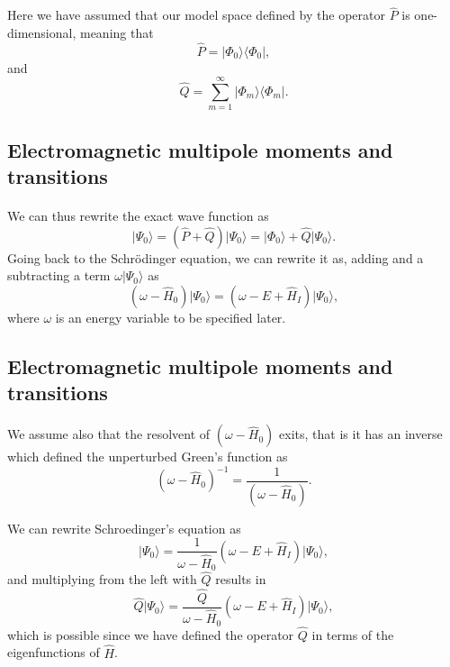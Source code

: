 \documentclass[%
oneside,                 %
final,                   %
10pt]{article}
\begin{document}
Here we have assumed that our model space defined by the operator $\hat{P}$ is one-dimensional, meaning that
\[
\hat{P}= \vert \Phi_0\rangle \langle \Phi_0\vert ,
\]
and
\[
\hat{Q}=\sum_{m=1}^{\infty}\vert \Phi_m\rangle \langle \Phi_m\vert .
\]



\subsection{Electromagnetic multipole moments and transitions}

\paragraph{}
We can thus rewrite the exact wave function as
\[
\vert \Psi_0\rangle= (\hat{P}+\hat{Q})\vert \Psi_0\rangle=\vert \Phi_0\rangle+\hat{Q}\vert \Psi_0\rangle.
\]
Going back to the Schr\"odinger equation, we can rewrite it as, adding and a subtracting a term $\omega \vert \Psi_0\rangle$ as
\[
\left(\omega-\hat{H}_0\right)\vert \Psi_0\rangle=\left(\omega-E+\hat{H}_I\right)\vert \Psi_0\rangle,
\]
where $\omega$ is an energy variable to be specified later.



\subsection{Electromagnetic multipole moments and transitions}

\paragraph{}
We assume also that the resolvent of $\left(\omega-\hat{H}_0\right)$ exits, that is
it has an inverse which defined the unperturbed Green's function as
\[
\left(\omega-\hat{H}_0\right)^{-1}=\frac{1}{\left(\omega-\hat{H}_0\right)}.
\]

We can rewrite Schroedinger's equation as
\[
\vert \Psi_0\rangle=\frac{1}{\omega-\hat{H}_0}\left(\omega-E+\hat{H}_I\right)\vert \Psi_0\rangle,
\]
and multiplying from the left with $\hat{Q}$ results in
\[
\hat{Q}\vert \Psi_0\rangle=\frac{\hat{Q}}{\omega-\hat{H}_0}\left(\omega-E+\hat{H}_I\right)\vert \Psi_0\rangle,
\]
which is possible since we have defined the operator $\hat{Q}$ in terms of the eigenfunctions of $\hat{H}$.
\end{document}
